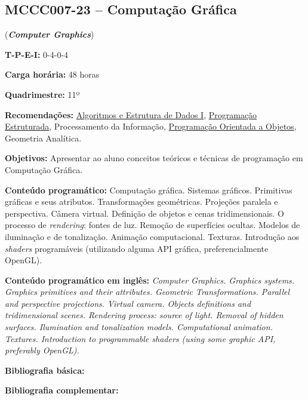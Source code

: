 \documentclass[class=article, crop=false]{standalone}
\begin{document}
\subsection*{MCCC007-23 -- Computação Gráfica}
\label{disc:cg}

(\textbf{\textit{Computer Graphics}})

\begin{center}
    \begin{minipage}{0.85\textwidth}
        \textbf{T-P-E-I:} 0-4-0-4
        
        \textbf{Carga horária:} 48 horas
        
        \textbf{Quadrimestre:} 11º
        
        \textbf{Recomendações:}
        \hyperref[disc:aedI]{Algoritmos e Estrutura de Dados I},
        \hyperref[disc:pe]{Programação Estruturada},
        Processamento da Informação, 
        \hyperref[disc:poo]{Programação Orientada a Objetos},
        Geometria Analítica.
    \end{minipage}
\end{center}

\textbf{Objetivos:}
Apresentar ao aluno conceitos teóricos e técnicas de programação em Computação
Gráfica.

\textbf{Conteúdo programático:}
Computação gráfica.
Sistemas gráficos.
Primitivas gráficas e seus atributos.
Transformações geométricas.
Projeções paralela e perspectiva.
Câmera virtual.
Definição de objetos e cenas tridimensionais.
O processo de \textit{rendering}: fontes de luz.
Remoção de superfícies ocultas.
Modelos de iluminação e de tonalização.
Animação computacional.
Texturas.
Introdução aos \textit{shaders} programáveis (utilizando alguma API gráfica, preferencialmente OpenGL).

\textbf{Conteúdo programático em inglês:}
\textit{Computer Graphics.
Graphics systems.
Graphics primitives and their attributes.
Geometric Transformations.
Parallel and perspective projections.
Virtual camera.
Objects definitions and tridimensional scenes.
Rendering process: source of light.
Removal of hidden surfaces.
Ilumination and tonalization models.
Computational animation.
Textures.
Introduction to programmable shaders (using some graphic API, preferably OpenGL).}

\newrefsection
\textbf{Bibliografia básica:}
\nocite{2008-gomes-etal,2003-azevedo-etal,2020-vries}
\printbibliography

\newrefsection
\textbf{Bibliografia complementar:}
\nocite{2003-edward,2004-edward,2009-bailey-etal,2005-shreiner-etal,2016-kessenich-etal}
\printbibliography
\end{document}
